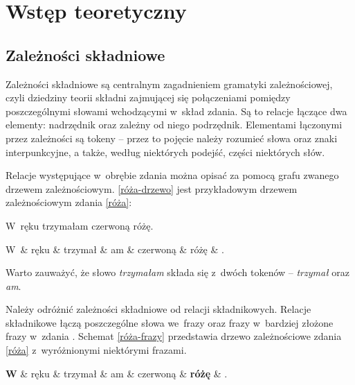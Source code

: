 \chapter{Wstęp teoretyczny} \label{ch2}
\section{Zależności składniowe}

Zależności składniowe są centralnym zagadnieniem gramatyki zależnościowej, czyli dziedziny teorii składni zajmującej się połączeniami pomiędzy poszczególnymi słowami wchodzącymi w~skład zdania. Są to relacje łączące dwa elementy: nadrzędnik oraz zależny od niego podrzędnik. Elementami łączonymi przez zależności są tokeny -- przez to pojęcie należy rozumieć słowa oraz znaki interpunkcyjne, a także, według niektórych podejść, części niektórych słów.

Relacje występujące w~obrębie zdania można opisać za pomocą grafu zwanego drzewem zależnościowym. \eqref{róża-drzewo} jest przykładowym drzewem zależnościowym zdania \eqref{róża}:

\begin{exe}
\ex \label{róża} W~ręku trzymałam czerwoną różę.\\ 
\ex \label{róża-drzewo}
\begin{dependency}[theme = simple, baseline=-\the\dimexpr\fontdimen22\textfont2\relax]
\begin{deptext}[column sep=1em]
W~\& ręku \& trzymał \& am \& czerwoną \& różę \& .  \\ 
\end{deptext}
\end{dependency}
\end{exe}

Warto zauważyć, że słowo \emph{trzymałam} składa się z~dwóch tokenów -- \emph{trzymał} oraz \emph{am}.

Należy odróżnić zależności składniowe od relacji składnikowych. Relacje składnikowe łączą poszczególne słowa we~frazy oraz frazy w~bardziej złożone frazy w~zdania \citep{chomsky1956three}.
Schemat \eqref{róża-frazy} przedstawia drzewo zależnościowe zdania \eqref{róża} z~wyróżnionymi niektórymi frazami.

\begin{exe}
\ex \label{róża-frazy}
\begin{dependency}[theme=simple, baseline=-\the\dimexpr\fontdimen22\textfont2\relax]
\begin{deptext}[column sep=1em]
\textbf{W} \& ręku \& trzymał \& am \& czerwoną \& \textbf{różę} \& .  \\ 
\end{deptext}
\end{dependency}
\end{exe}

